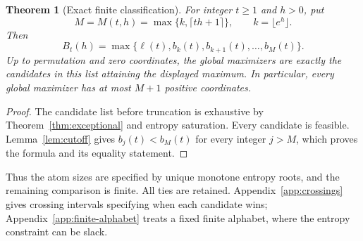 \documentclass[11pt]{article}
\numberwithin{equation}{section}
\newtheorem{theorem}{Theorem}[section]
\begin{document}
\begin{theorem}[Exact finite classification]\label{thm:finite-classification}
For integer $t\ge1$ and $h>0$, put
\begin{equation}\label{eq:M-cutoff}
 M=M(t,h)=\max\{k,\lceil th+1\rceil\},\qquad k=\lfloor e^h\rfloor.
\end{equation}
Then
\begin{equation}\label{eq:finite-maximum}
 B_t(h)=\max\{\ell(t),b_k(t),b_{k+1}(t),\ldots,b_M(t)\}.
\end{equation}
Up to permutation and zero coordinates, the global maximizers are exactly
the candidates in this list attaining the displayed maximum. In particular,
every global maximizer has at most $M+1$ positive coordinates.
\end{theorem}
\begin{proof}
The candidate list before truncation is exhaustive by
Theorem~\ref{thm:exceptional} and entropy saturation. Every candidate is
feasible. Lemma~\ref{lem:cutoff} gives $b_j(t)<b_M(t)$ for every integer
$j>M$, which proves the formula and its equality statement.
\end{proof}

Thus the atom sizes are specified by unique monotone entropy roots, and the
remaining comparison is finite. All ties are retained. Appendix~\ref{app:crossings}
gives crossing intervals specifying when each candidate wins;
Appendix~\ref{app:finite-alphabet} treats a fixed finite alphabet, where the
entropy constraint can be slack.
\end{document}
